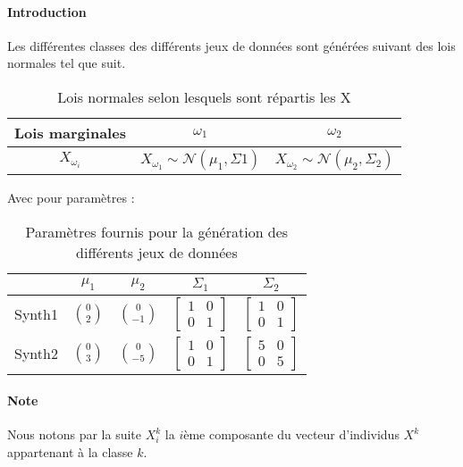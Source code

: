 \documentclass{report}
\begin{document}
\paragraph{Introduction}
Les différentes classes des différents jeux de données sont générées suivant des lois normales tel que suit.
\begin{table}[h!]
    \centering
    \caption{Lois normales selon lesquels sont répartis les X}
    \label{tab:table1}
    \begin{tabular}{c||c|c}
        Lois marginales & $\omega_1$ & $\omega_2$\\
        \hline
        $X_{\omega_i}$ & $X_{\omega_1} \sim \mathcal{N}(\mu_1, \Sigma1)$ & $X_{\omega_2} \sim \mathcal{N}(\mu_2, \Sigma_2)$ \\
    \end{tabular}
\end{table}

Avec pour paramètres :

\begin{table}[h!]
    \centering
    \caption{Paramètres fournis pour la génération des différents jeux de données}
    \label{tab:table1}
    \def\arraystretch{1.5}
    \begin{tabular}{c||c|c|c|c}
             & $\mu_1$ & $\mu_2$ & $\Sigma_1$ & $\Sigma_2$\\
        \hline
            Synth1 & $\binom{0}{2}$ & $\binom{0}{-1}$
            & $\begin{bmatrix} 1 & 0\\ 0 & 1 \end{bmatrix}$
            & $\begin{bmatrix} 1 & 0\\ 0 & 1 \end{bmatrix}$\\
        \hline
            Synth2 & $\binom{0}{3}$ & $\binom{0}{-5}$
            & $\begin{bmatrix} 1 & 0\\ 0 & 1 \end{bmatrix}$
            & $\begin{bmatrix} 5 & 0\\ 0 & 5 \end{bmatrix}$\\
    \end{tabular}
\end{table}

\paragraph{Note} Nous notons par la suite $X_i^k$ la $i$ème composante du vecteur d'individus $X^k$ appartenant à la classe $k$.
\end{document}
